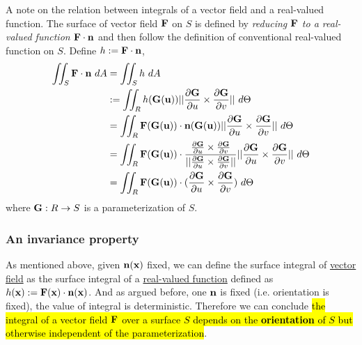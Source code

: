 \documentclass[11pt]{article}
\newcommand{\veG}[0]{\ve{G}}
\begin{document}
				\begin{remark}
					A note on the relation between integrals of a vector field and a real-valued function. The surface of vector field $\textbf{F}$ on $S$ is defined by \emph{reducing $\textbf{F}$ to a real-valued function $\textbf{F}\cdot \textbf{n}$} and then follow the definition of conventional real-valued function on $S$. Define $h := \textbf{F} \cdot \textbf{n}$,
					\begin{align}
						\iint_S \ve{F} \cdot \ve{n}\ dA &= \iint_S h\ dA \\
						&:= \iint_R h(\ve{G}(\ve{u})) \norm{\pd{\ve{G}}{u} \times \pd{\ve{G}}{v}}\ d\Theta \\
						&= \iint_R \ve{F}(\ve{G}(\ve{u})) \cdot \ve{n}(\ve{G}(\ve{u})) \norm{\pd{\ve{G}}{u} \times \pd{\ve{G}}{v}}\ d\Theta \\
						&= \iint_R \ve{F}(\ve{G}(\ve{u})) \cdot \frac{\pd{\ve{G}}{u} \times \pd{\ve{G}}{v}}{\norm{\pd{\ve{G}}{u} \times \pd{\ve{G}}{v}}} \norm{\pd{\ve{G}}{u} \times \pd{\ve{G}}{v}}\ d\Theta \\
						&= \iint_R \ve{F}(\ve{G}(\ve{u})) \cdot (\pd{\ve{G}}{u} \times \pd{\ve{G}}{v})\ d\Theta
					\end{align}
					where $\veG: R \to S$ is a parameterization of $S$.
				\end{remark}
			\subsubsection{An invariance property}
				\begin{remark}
					As mentioned above, given $\textbf{n}(\textbf{x})$ fixed, we can define the surface integral of \ul{vector field} as the surface integral of a \ul{real-valued function} defined as $h(\textbf{x}) := \textbf{F}(\textbf{x}) \cdot \textbf{n}(\textbf{x})$. And as argued before, one $\textbf{n}$ is fixed (i.e. orientation is fixed), the value of integral is deterministic. Therefore we can conclude \hl{the integral of a vector field $\textbf{F}$ over a surface $S$ depends on the \textbf{orientation} of $S$ but otherwise independent of the parameterization}.
				\end{remark}
				
\end{document}
